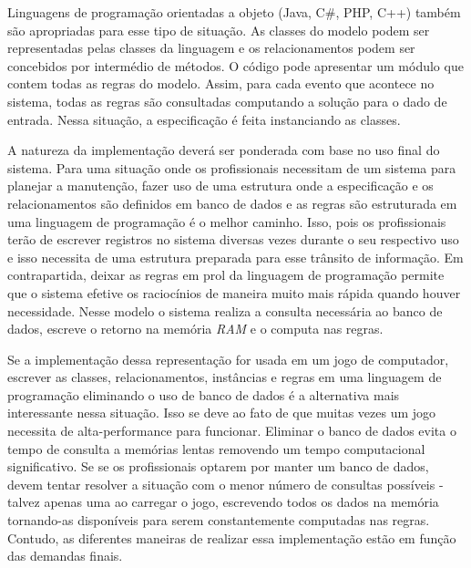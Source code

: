 Linguagens de programação orientadas a objeto (Java, C$\#$, PHP, C++) também são apropriadas para esse tipo de situação. As classes do modelo podem ser representadas pelas classes da linguagem e os relacionamentos podem ser concebidos por intermédio de métodos. O código pode apresentar um módulo que contem todas as regras do modelo. Assim, 
para cada evento que acontece no sistema, todas as regras são consultadas computando a solução para o dado de entrada. Nessa situação, a especificação é feita instanciando as classes. 

A natureza da implementação deverá ser ponderada com base no uso final do sistema. Para uma situação onde os profissionais necessitam de um sistema para planejar a manutenção, fazer uso de uma estrutura onde a especificação e os relacionamentos são definidos em banco de dados e as regras são estruturada em uma linguagem de programação é o melhor caminho. Isso, pois os profissionais terão de escrever registros no sistema diversas vezes durante o seu respectivo uso e isso necessita de uma estrutura preparada para esse trânsito de informação. Em contrapartida, deixar as regras em prol da linguagem de programação permite que o sistema efetive os raciocínios de maneira muito mais rápida quando houver necessidade. Nesse modelo o sistema realiza a consulta necessária ao banco de dados, escreve o retorno na memória \textit{RAM} e o computa
nas regras. 

Se a implementação dessa representação for usada em um jogo de computador, escrever as classes, relacionamentos, instâncias e regras em uma linguagem de programação eliminando o uso de banco de dados é a alternativa mais interessante nessa situação. Isso se deve ao fato de que muitas vezes um jogo necessita de alta-performance para 
funcionar. Eliminar o banco de dados evita o tempo de consulta a memórias lentas removendo um tempo computacional significativo. Se se os profissionais optarem por manter 
um banco de dados, devem tentar resolver a situação com o menor número de consultas possíveis - talvez apenas uma ao carregar o jogo, escrevendo todos os dados na memória  
tornando-as disponíveis para serem constantemente computadas nas regras. Contudo, as diferentes maneiras de realizar essa implementação estão em função das demandas finais. 